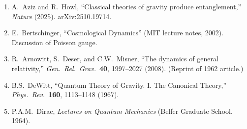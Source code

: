 \documentclass[12pt,a4paper]{article}
\begin{document}
\begin{enumerate}
\item A.\ Aziz and R.\ Howl, ``Classical theories of gravity produce entanglement,'' \textit{Nature} (2025). arXiv:2510.19714.

\item E.\ Bertschinger, ``Cosmological Dynamics'' (MIT lecture notes, 2002). Discussion of Poisson gauge.

\item R.\ Arnowitt, S.\ Deser, and C.W.\ Misner, ``The dynamics of general relativity,'' \textit{Gen.\ Rel.\ Grav.}\ \textbf{40}, 1997--2027 (2008). (Reprint of 1962 article.)

\item B.S.\ DeWitt, ``Quantum Theory of Gravity. I. The Canonical Theory,'' \textit{Phys.\ Rev.}\ \textbf{160}, 1113--1148 (1967).

\item P.A.M.\ Dirac, \textit{Lectures on Quantum Mechanics} (Belfer Graduate School, 1964).
\end{enumerate}
\end{document}
